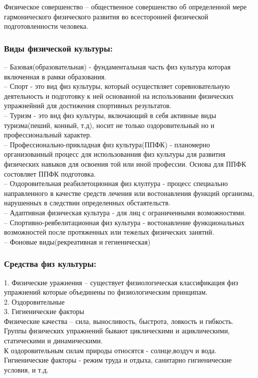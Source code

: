 \documentclass[a4paper, 12pt]{article}
\begin{document}
Физическое совершенство -- общественное совершенство об определенной мере гармонического физического развития во всесторонней физической подготовленности человека.\\

\subsubsection*{Виды физической культуры:}
-- Базовая(образовательная) - фундаментальная часть физ культура которая включенная в рамки образования.\\
-- Спорт - это вид физ культуры, который осуществляет соревновательную деятельность и подготовку к ней основанной на использовании физических упражнейний для достижения спортивных результатов.\\
-- Туризм - это вид физ культуры, включающий в себя активные виды туризма(пеший, конный, т.д), носит не только оздоровительный но и профессиональный характер.\\
-- Профессионально-прикладная физ культура(ППФК) - планомерно организованный процесс для использованния физ культуры для развития физических навыков для освоения той или иной профессии. Основа для ППФК состовляет ППФК подготовка.\\
-- Оздоровительная реабилетоционная физ клултура - процесс специально направленного в качестве средств лечения или востонавления функций организма, нарушенных в следствии определенных обстаятельств.\\
-- Адаптивная физическая культура - для лиц с ограниченными возможностями.\\
-- Спортивно-ревбелитационная  физ культура - востонавление функциональных возможностей после протяженных или тежелых физических занятий.\\
-- Фоновые виды(рекреативная и гегиеническая)\\

\subsubsection*{Средства физ культуры:}
1. Физические уражнения -- существует физиологическая классификация физ упражнений которые объединены по физиологическим принципам.\\
2. Оздоровительные \\
3. Гигиенические факторы\\

Физические качества -- сила, выносливость, быстрота, ловкость и гибкость.\\
Группы физических упражнений бывают циклическими и ациклическими, статическими и динамическими.\\
К оздоровительным силам природы относятся - солнце,воздуч и вода.\\
Гигиенические факторы - режим труда и отдыха, санитарно гигиенические условия, и т.д.\\
\end{document}

